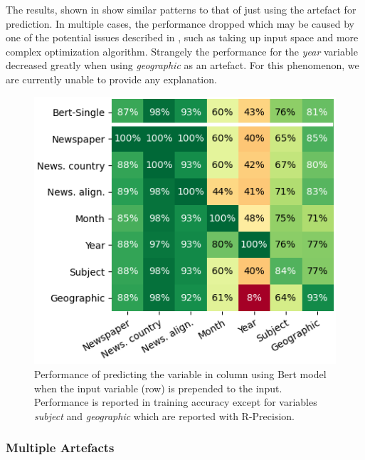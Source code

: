 The results, shown in  show similar patterns to that of just using the artefact for prediction.
In multiple cases, the performance dropped which may be caused by one of the potential issues described in , such as taking up input space and more complex optimization algorithm.
Strangely the performance for the \emph{year} variable decreased greatly when using \emph{geographic} as an artefact.
For this phenomenon, we are currently unable to provide any explanation.

\begin{figure}[ht]
\includegraphics[width=1\linewidth]{img/bert_1v1_heatmap.png}
\caption{Performance of predicting the variable in column using Bert model when the input variable (row) is prepended to the input. Performance is reported in training accuracy except for variables \emph{subject} and \emph{geographic} which are reported with R-Precision.}
\label{fig:feature_dependency_bert}
\end{figure}

\subsubsection{Multiple Artefacts} \label{subsubsec:multiple_artefacts}

